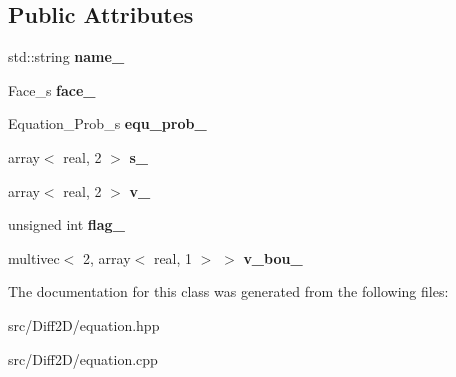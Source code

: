 \subsection*{Public Attributes}
\begin{DoxyCompactItemize}
\item 
\hypertarget{classEquation_a2bbb65c98ebf1345231370e93b504037}{std\-::string {\bfseries name\-\_\-}}\label{classEquation_a2bbb65c98ebf1345231370e93b504037}

\item 
\hypertarget{classEquation_a9eeeceed0d8130fd30fb2e65f3b15f3f}{Face\-\_\-s {\bfseries face\-\_\-}}\label{classEquation_a9eeeceed0d8130fd30fb2e65f3b15f3f}

\item 
\hypertarget{classEquation_a1ece93bf1c58eb22001327da69ab73fc}{Equation\-\_\-\-Prob\-\_\-s {\bfseries equ\-\_\-prob\-\_\-}}\label{classEquation_a1ece93bf1c58eb22001327da69ab73fc}

\item 
\hypertarget{classEquation_ac7f793f3b1e3694b719d91d884460880}{array$<$ real, 2 $>$ {\bfseries s\-\_\-}}\label{classEquation_ac7f793f3b1e3694b719d91d884460880}

\item 
\hypertarget{classEquation_aa48c28c116aec278f7713a414dec6196}{array$<$ real, 2 $>$ {\bfseries v\-\_\-}}\label{classEquation_aa48c28c116aec278f7713a414dec6196}

\item 
\hypertarget{classEquation_a1820f1ab792e83981456fce5dda492b9}{unsigned int {\bfseries flag\-\_\-}}\label{classEquation_a1820f1ab792e83981456fce5dda492b9}

\item 
\hypertarget{classEquation_ab4039b291316d3a42c43330e868b4f50}{multivec$<$ 2, array$<$ real, 1 $>$ $>$ {\bfseries v\-\_\-bou\-\_\-}}\label{classEquation_ab4039b291316d3a42c43330e868b4f50}

\end{DoxyCompactItemize}


The documentation for this class was generated from the following files\-:\begin{DoxyCompactItemize}
\item 
src/\-Diff2\-D/equation.\-hpp\item 
src/\-Diff2\-D/equation.\-cpp\end{DoxyCompactItemize}

